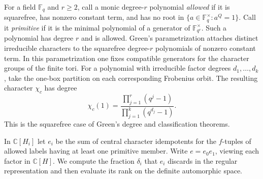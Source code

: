\documentclass[a4paper,11pt]{article}
\theoremstyle{definition}
\theoremstyle{remark}
\numberwithin{equation}{section}
\begin{document}
For a field \(\mathbb F_q\) and \(r\ge2\), call a monic
degree-\(r\) polynomial \emph{allowed} if it is squarefree,
has nonzero constant term, and has no root in
\(\{a\in\mathbb F_q^\times:a^Q=1\}\). Call it \emph{primitive}
if it is the minimal polynomial of a generator of
\(\mathbb F_{q^r}^\times\). Such a polynomial has degree \(r\)
and is allowed. Green's parametrization attaches distinct
irreducible characters to the squarefree degree-\(r\) polynomials
of nonzero constant term. In this parametrization one fixes
compatible generators for the character groups of the finite
tori. For a polynomial with irreducible factor degrees
\(d_1,\ldots,d_k\), take the one-box partition on each
corresponding Frobenius orbit. The resulting character \(\chi_c\)
has degree
\[
             \chi_c(1)=
        \frac{\prod_{j=1}^{r}(q^j-1)}{\prod_{j=1}^{k}(q^{d_j}-1)} .
\]
This is the squarefree case of Green's degree and classification
theorems.~\cite[\S8, Thms.~13--14]{XXV-XX-XX-green678}

In \(\mathbb C[H_i]\) let \(e_i\) be the sum of central
character idempotents for the \(f\)-tuples of allowed labels
having at least one primitive member. Write \(e=e_0e_1\), viewing
each factor in \(\mathbb C[H]\). We compute the fraction
\(\delta_i\) that \(e_i\) discards in the regular representation
and then evaluate its rank on the definite automorphic space.
\end{document}
